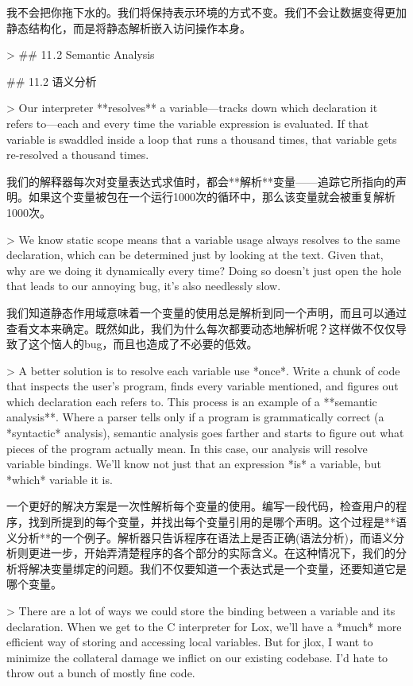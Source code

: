 \documentclass[cn,11pt,chinese]{elegantbook}
\begin{document}
{{{{{{{{{{{{我不会把你拖下水的。我们将保持表示环境的方式不变。我们不会让数据变得更加静态结构化，而是将静态解析嵌入访问操作本身。

> ## 11 . 2 Semantic Analysis

## 11.2 语义分析

> Our interpreter **resolves** a variable—tracks down which declaration it refers to—each and every time the variable expression is evaluated. If that variable is swaddled inside a loop that runs a thousand times, that variable gets re-resolved a thousand times.

我们的解释器每次对变量表达式求值时，都会**解析**变量——追踪它所指向的声明。如果这个变量被包在一个运行1000次的循环中，那么该变量就会被重复解析1000次。

> We know static scope means that a variable usage always resolves to the same declaration, which can be determined just by looking at the text. Given that, why are we doing it dynamically every time? Doing so doesn’t just open the hole that leads to our annoying bug, it’s also needlessly slow.

我们知道静态作用域意味着一个变量的使用总是解析到同一个声明，而且可以通过查看文本来确定。既然如此，我们为什么每次都要动态地解析呢？这样做不仅仅导致了这个恼人的bug，而且也造成了不必要的低效。

> A better solution is to resolve each variable use *once*. Write a chunk of code that inspects the user’s program, finds every variable mentioned, and figures out which declaration each refers to. This process is an example of a **semantic analysis**. Where a parser tells only if a program is grammatically correct (a *syntactic* analysis), semantic analysis goes farther and starts to figure out what pieces of the program actually mean. In this case, our analysis will resolve variable bindings. We’ll know not just that an expression *is* a variable, but *which* variable it is.

一个更好的解决方案是一次性解析每个变量的使用。编写一段代码，检查用户的程序，找到所提到的每个变量，并找出每个变量引用的是哪个声明。这个过程是**语义分析**的一个例子。解析器只告诉程序在语法上是否正确(语法分析)，而语义分析则更进一步，开始弄清楚程序的各个部分的实际含义。在这种情况下，我们的分析将解决变量绑定的问题。我们不仅要知道一个表达式是一个变量，还要知道它是哪个变量。

> There are a lot of ways we could store the binding between a variable and its declaration. When we get to the C interpreter for Lox, we’ll have a *much* more efficient way of storing and accessing local variables. But for jlox, I want to minimize the collateral damage we inflict on our existing codebase. I’d hate to throw out a bunch of mostly fine code.

}}}}}}}}}}}}
\end{document}

